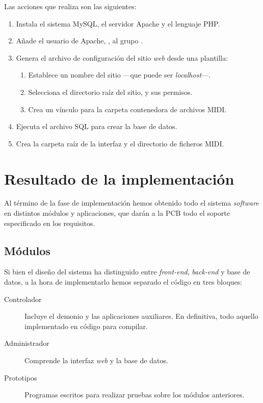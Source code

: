 Las acciones que realiza son las siguientes:

\begin{enumerate}
	\item Instala el sistema MySQL, el servidor Apache y el lenguaje \acrshort{PHP}.
	\item Añade el usuario de Apache, , al grupo .
	\item Genera el archivo de configuración del sitio \textit{web} desde una plantilla:
	
	\begin{enumerate}
		\item Establece un nombre del sitio ---que puede ser \textit{localhost}---.
		\item Selecciona el directorio raíz del sitio, y sus permisos.
		\item Crea un vínculo para la carpeta contenedora de archivos \acrshort{MIDI}.
	\end{enumerate}
	
	\item Ejecuta el archivo \acrshort{SQL} para crear la base de datos.
	\item Crea la carpeta raíz de la interfaz y el directorio de ficheros \acrshort{MIDI}.
\end{enumerate}

\newpage

\section{Resultado de la implementación}

Al término de la fase de implementación hemos obtenido todo el sistema \textit{software} en distintos módulos y aplicaciones, que darán a la \acrshort{PCB} todo el soporte especificado en los requisitos.

\subsection{Módulos}

Si bien el diseño del sistema ha distinguido entre \textit{front-end}, \textit{back-end} y base de datos, a la hora de implementarlo hemos separado el código en tres bloques:

\begin{description}
	\item[Controlador] Incluye el demonio y las aplicaciones auxiliares. En definitiva, todo aquello implementado en código para compilar.
	\item[Administrador] Comprende la interfaz \textit{web} y la base de datos.
	\item[Prototipos] Programas escritos para realizar pruebas sobre los módulos anteriores.
\end{description}

